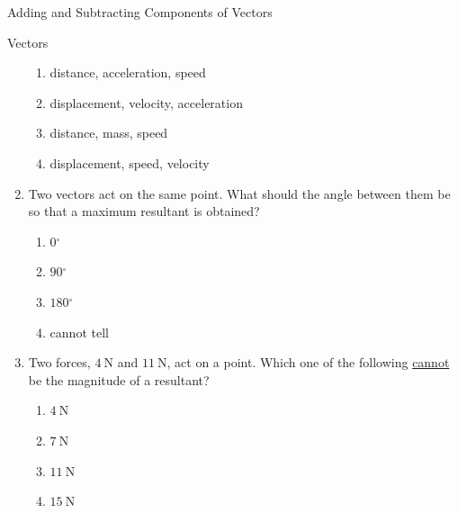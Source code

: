 \begin{exercises}{Adding and Subtracting Components of Vectors}
\begin{eocexercises}{Vectors}
\begin{enumerate}[noitemsep, label=\textbf{\arabic*}.]
\label{m38819*id197890}\begin{enumerate}[noitemsep, label=\textbf{\alph*}. ] 
            \label{m38819*uid103}\item distance, acceleration, speed
\label{m38819*uid104}\item displacement, velocity, acceleration
\label{m38819*uid105}\item distance, mass, speed
\label{m38819*uid106}\item displacement, speed, velocity
\end{enumerate}
                \label{m38819*uid107}\item Two vectors act on the same point. What should the angle between them be so that a maximum resultant is obtained?
\label{m38819*id197965}\begin{enumerate}[noitemsep, label=\textbf{\alph*}. ] 
            \label{m38819*uid108}\item $0{}^{\circ }$\label{m38819*uid109}\item $90{}^{\circ }$\label{m38819*uid110}\item $180{}^{\circ }$\label{m38819*uid111}\item cannot tell
\end{enumerate}
                \label{m38819*uid112}\item Two forces, $4 ~\text{N}$ and $11 ~\text{N}$, act on a point. Which one of the following \uline{cannot} be the magnitude of a resultant?
\label{m38819*id198082}\begin{enumerate}[noitemsep, label=\textbf{\alph*}. ] 
            \label{m38819*uid113}\item $4 ~\text{N}$
\label{m38819*uid114}\item $7 ~\text{N}$
\label{m38819*uid115}\item $11 ~\text{N}$
\label{m38819*uid116}\item $15 ~\text{N}$
\end{enumerate}


\end{enumerate}
\end{eocexercises}
\end{exercises}
